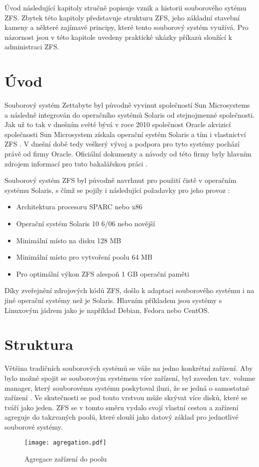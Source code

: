 Úvod následující kapitoly stručně popisuje vznik a historii souborového sytému ZFS. Zbytek této kapitoly představuje strukturu ZFS, jeho základní stavební kameny a některé zajímavé principy, které tento souborový systém využívá. Pro názornost jsou v této kapitole uvedeny praktické ukázky příkazů sloužící k administraci ZFS.

\section{Úvod}
    Souborový systém Zettabyte byl původně vyvinut společností Sun Microsystems a následně integrován do operačního systémů Solaris od stejnojmenné společnosti.
    Jak už to tak v dnešním světě bývá v roce 2010 společnost Oracle akvizicí společnosti Sun Microsystem získala operační systém Solaris a tím i vlastnictví ZFS \cite{suns}. V dnešní době tedy veškerý vývoj a podpora pro tyto systémy pochází právě od firmy Oracle. Oficiální dokumenty a návody od této firmy byly hlavním zdrojem informací pro tuto bakalářskou práci \cite{guide}.

    Souborový systém ZFS byl původně navrhnut pro použití čistě v operačním systému Solaris, s čímž se pojily i následující požadavky pro jeho provoz \cite{requirements}:
    \begin{itemize}
      \item Architektura procesoru SPARC nebo x86
      \item Operační systém Solaris 10 6/06 nebo novější
      \item Minimální místo na disku 128 MB
      \item Minimální místo pro vytvoření poolu 64 MB
      \item Pro optimální výkon ZFS alespoň 1 GB operační paměti
    \end{itemize}

    Díky zveřejnění zdrojových kódů ZFS, došlo k adaptaci souborového systému i na jiné operační systémy než je Solaris. Hlavním příkladem jsou systémy s Linuxovým jádrem jako je například Debian, Fedora nebo CentOS.

\section{Struktura}
Většina tradičních souborových systémů se váže na jedno konkrétní zařízení. Aby bylo možné spojit se souborovým systémem více zařízení, byl zaveden tzv. volume manager, který souborovému systému poskytoval iluzi, že se jedná o samostatné zařízení \cite{traditional}. Ve skutečnosti se pod touto vrstvou může skrývat více disků, které se tváří jako jeden. ZFS se v tomto směru vydalo svojí vlastní cestou a zařízení agreguje do takzvaných poolů, které slouží jako datový základ pro jednotlivé souborové systémy.
\begin{figure}
    \centering
    \texttt{[image: agregation.pdf]}
    \caption{Agregace zařízení do poolu}
    \label{agregation}
\end{figure}
